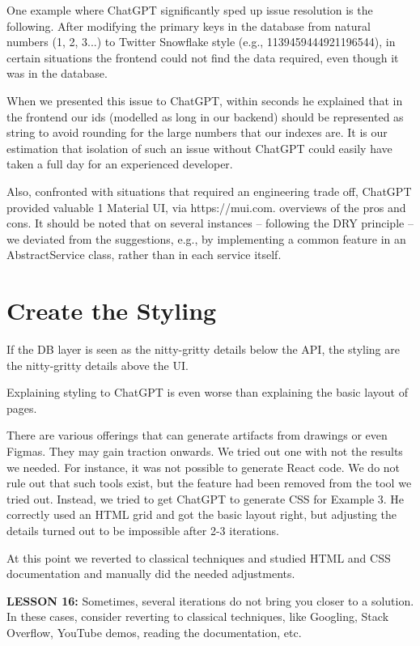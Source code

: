 \documentclass[runningheads]{llncs}
\begin{document}
One example where ChatGPT significantly sped up issue resolution is the following. After modifying the primary keys in the database from natural numbers (1, 2, 3...) to Twitter Snowflake style (e.g., 1139459444921196544), in certain situations the frontend could not find the data required, even though it was in the database.

When we presented this issue to ChatGPT, within seconds he explained that in the frontend our ids (modelled as long in our backend) should be represented as string to avoid rounding for the large numbers that our indexes are. It is our estimation that isolation of such an issue without ChatGPT could easily have taken a full day for an experienced developer.

Also, confronted with situations that required an engineering trade off, ChatGPT provided valuable
1 Material UI, via https://mui.com.
overviews of the pros and cons. It should be noted that on several instances – following the DRY principle – we deviated from the suggestions, e.g., by implementing a common feature in an AbstractService class, rather than in each service itself.

\section{Create the Styling}
If the DB layer is seen as the nitty-gritty details below the API, the styling are the nitty-gritty details above the UI.

Explaining styling to ChatGPT is even worse than explaining the basic layout of pages.

There are various offerings that can generate artifacts from drawings or even Figmas. They may gain traction onwards. We tried out one with not the results we needed. For instance, it was not possible to generate React code. We do not rule out that such tools exist, but the feature had been removed from the tool we tried out.
Instead, we tried to get ChatGPT to generate CSS for Example 3. He correctly used an HTML grid and got the basic layout right, but adjusting the details turned out to be 
impossible after 2-3 iterations.

At this point we reverted to classical techniques and studied HTML and CSS documentation and manually did the needed adjustments.

\textbf{LESSON 16:} Sometimes, several iterations do not bring you closer to a solution. In these cases, consider reverting to classical techniques, like Googling, Stack Overflow, YouTube demos, reading the documentation, etc.
\end{document}
